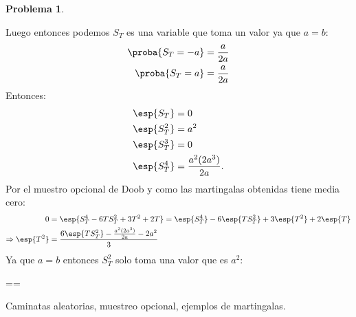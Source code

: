 \documentclass[a5paper,oneside]{amsart}
\theoremstyle{plain}
\theoremstyle{definition}
\newtheorem{problema}{Problema}
\begin{document}
\begin{problema}
\begin{enumerate}
Luego entonces podemos $S_T$  es una variable que toma un valor ya que $a=b$:
\begin{align}
\proba{S_T=-a}&=\frac{a}{2a} \notag \\
\proba{S_T=a}&=\frac{a}{2a} \notag
\end{align}
Entonces: 
\begin{align}
\esp{S_T}&=0 \notag \\
\esp{S_T^2}&=a^2 \notag \\
\esp{S_T^3}&=0 \notag \\
\esp{S_T^4}&=\frac{a^2(2a^3)}{2a}. \notag
\end{align}
Por el muestro opcional de Doob y como las martingalas obtenidas tiene media cero:
\begin{align}
0&=\esp{S_T^4-6TS_T^2+3T^2+2T}=\esp{S_T^4}-6\esp{TS_T^2}+3\esp{T^2}+2\esp{T}\notag \\
\Rightarrow\esp{T^2}&=\frac{6\esp{TS_T^2}-\frac{a^2(2a^3)}{2a}-2a^2}{3} \notag
\end{align}
Ya que $a=b$ entonces $S_T^2$ solo toma una valor que es $a^2$:
\begin {esn}
==
\end{esn}
 

\end{enumerate}

 Caminatas aleatorias, muestreo opcional, ejemplos de martingalas. 
\end{problema}
\end{document}
